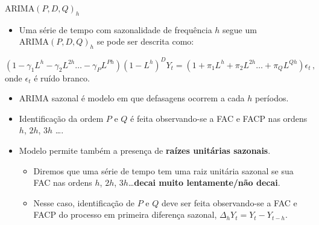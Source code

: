 \documentclass[11pt]{beamer}
\begin{document}
\begin{frame}{$\text{ARIMA}(P,D,Q)_h$}
\begin{itemize}
	\item Uma série de tempo com sazonalidade de frequência $h$ segue um $\text{ARIMA}(P,D,Q)_h$ se pode ser descrita como:
\end{itemize}

	$$(1-\gamma_1 L^h - \gamma_2 L^{2h} \ldots - \gamma_{P} L^{Ph})(1-L^h)^DY_t = (1+\pi_1 L^h + \pi_2 L^{2h} \ldots + \pi_{Q} L^{Qh})\epsilon_t \,, $$
	onde $\epsilon_t$ é ruído branco.
	
	\begin{itemize}
	\item ARIMA sazonal é modelo em que defasagens ocorrem a cada $h$ períodos.
	\item Identificação da ordem  $P$ e $Q$ é feita observando-se a FAC e FACP nas ordens $h$, $2h$, $3h$ \ldots.
	\item Modelo permite também a presença de \textbf{raízes unitárias sazonais}.
	\begin{itemize}
		\item Diremos que uma série de tempo tem uma raiz unitária sazonal se sua FAC nas ordens $h$, $2h$, $3h$\ldots \textbf{decai muito lentamente/não decai}.
		\item Nesse caso, identificação de $P$ e $Q$ deve ser feita observando-se a FAC e FACP do processo em primeira diferença sazonal, $\Delta_h Y_t = Y_t - Y_{t-h}$.
	\end{itemize} 
\end{itemize}
\end{frame}
\end{document}
